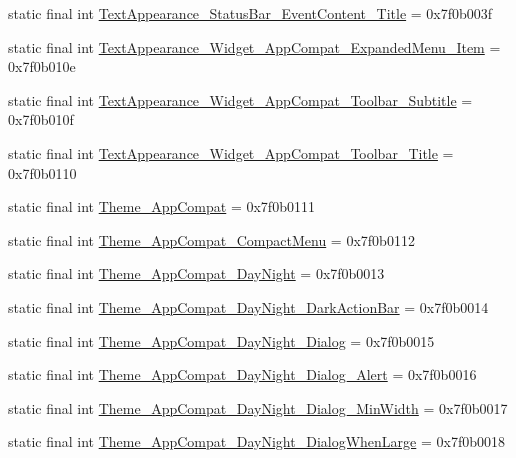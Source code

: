 \begin{CompactItemize}
\item 
static final int \hyperlink{classandroid_1_1support_1_1v7_1_1palette_1_1_r_1_1style_d09a8ae8d9352cd9de891c537620bf21}{TextAppearance\_\-StatusBar\_\-EventContent\_\-Title} = 0x7f0b003f
\item 
static final int \hyperlink{classandroid_1_1support_1_1v7_1_1palette_1_1_r_1_1style_ef13cb128efedebc5d51bc93e6ccfc0d}{TextAppearance\_\-Widget\_\-AppCompat\_\-ExpandedMenu\_\-Item} = 0x7f0b010e
\item 
static final int \hyperlink{classandroid_1_1support_1_1v7_1_1palette_1_1_r_1_1style_c0a04f5422e635e84334e9395473188b}{TextAppearance\_\-Widget\_\-AppCompat\_\-Toolbar\_\-Subtitle} = 0x7f0b010f
\item 
static final int \hyperlink{classandroid_1_1support_1_1v7_1_1palette_1_1_r_1_1style_4bb01cf46377691437ed1dfad77edab4}{TextAppearance\_\-Widget\_\-AppCompat\_\-Toolbar\_\-Title} = 0x7f0b0110
\item 
static final int \hyperlink{classandroid_1_1support_1_1v7_1_1palette_1_1_r_1_1style_5fc13bdbeae49403d2a72c8c71d34c6b}{Theme\_\-AppCompat} = 0x7f0b0111
\item 
static final int \hyperlink{classandroid_1_1support_1_1v7_1_1palette_1_1_r_1_1style_5b5781f4aed3af79c7fba859c364dcd0}{Theme\_\-AppCompat\_\-CompactMenu} = 0x7f0b0112
\item 
static final int \hyperlink{classandroid_1_1support_1_1v7_1_1palette_1_1_r_1_1style_99a9643799a99f605aa46220010ffb4e}{Theme\_\-AppCompat\_\-DayNight} = 0x7f0b0013
\item 
static final int \hyperlink{classandroid_1_1support_1_1v7_1_1palette_1_1_r_1_1style_4540a54c5ca5e12afe2ba9e7acc1034b}{Theme\_\-AppCompat\_\-DayNight\_\-DarkActionBar} = 0x7f0b0014
\item 
static final int \hyperlink{classandroid_1_1support_1_1v7_1_1palette_1_1_r_1_1style_9e5589505c8fb2319604577b0b62c8a8}{Theme\_\-AppCompat\_\-DayNight\_\-Dialog} = 0x7f0b0015
\item 
static final int \hyperlink{classandroid_1_1support_1_1v7_1_1palette_1_1_r_1_1style_2a3ebba31bf0bb93fc60514d035c6376}{Theme\_\-AppCompat\_\-DayNight\_\-Dialog\_\-Alert} = 0x7f0b0016
\item 
static final int \hyperlink{classandroid_1_1support_1_1v7_1_1palette_1_1_r_1_1style_01c134806c0719c4ccdd4c4e5e920412}{Theme\_\-AppCompat\_\-DayNight\_\-Dialog\_\-MinWidth} = 0x7f0b0017
\item 
static final int \hyperlink{classandroid_1_1support_1_1v7_1_1palette_1_1_r_1_1style_658449e32e18e0de4b1db5c58bcf3c8b}{Theme\_\-AppCompat\_\-DayNight\_\-DialogWhenLarge} = 0x7f0b0018

\end{CompactItemize}
